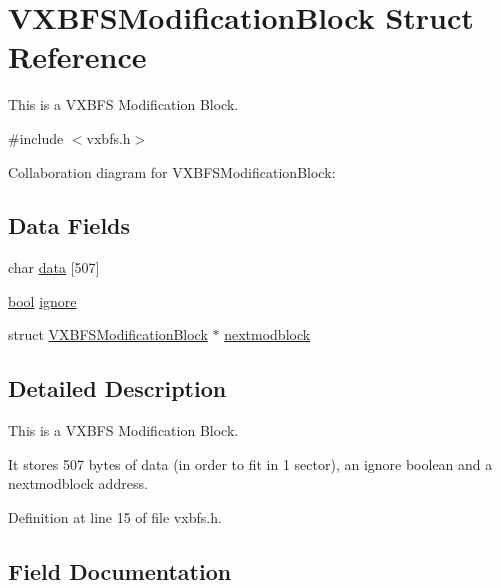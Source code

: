 \hypertarget{a00258}{}\section{V\+X\+B\+F\+S\+Modification\+Block Struct Reference}
\label{a00258}


This is a V\+X\+B\+FS Modification Block.  




{\ttfamily \#include $<$vxbfs.\+h$>$}



Collaboration diagram for V\+X\+B\+F\+S\+Modification\+Block\+:
\subsection*{Data Fields}
\begin{DoxyCompactItemize}
\item 
char \hyperlink{a00258_a327348a3ea3a02cfde4cdb1ccdcf2073_a327348a3ea3a02cfde4cdb1ccdcf2073}{data} \mbox{[}507\mbox{]}
\item 
\hyperlink{a00116_af6a258d8f3ee5206d682d799316314b1_af6a258d8f3ee5206d682d799316314b1}{bool} \hyperlink{a00258_a0f4e6adc96a9bee9135ce10b344679fb_a0f4e6adc96a9bee9135ce10b344679fb}{ignore}
\item 
struct \hyperlink{a00258}{V\+X\+B\+F\+S\+Modification\+Block} $\ast$ \hyperlink{a00258_afbf261c73a36b4d33e8a8b5179d4385b_afbf261c73a36b4d33e8a8b5179d4385b}{nextmodblock}
\end{DoxyCompactItemize}


\subsection{Detailed Description}
This is a V\+X\+B\+FS Modification Block. 

It stores 507 bytes of data (in order to fit in 1 sector), an ignore boolean and a nextmodblock address. 

Definition at line 15 of file vxbfs.\+h.



\subsection{Field Documentation}
\mbox{\label{a00258_a327348a3ea3a02cfde4cdb1ccdcf2073_a327348a3ea3a02cfde4cdb1ccdcf2073}} 
